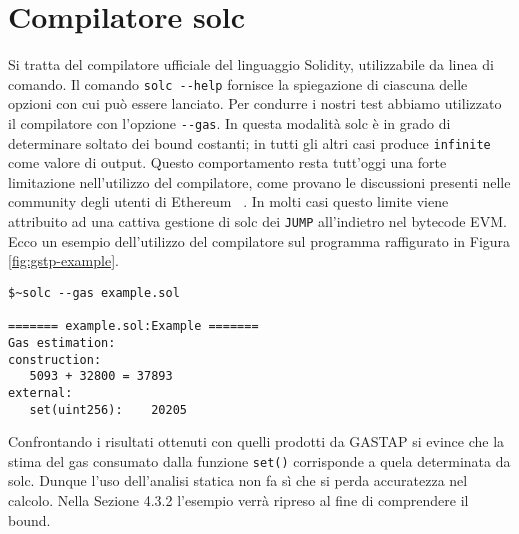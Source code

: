     
\section{Compilatore solc}

Si tratta del compilatore ufficiale del linguaggio Solidity, utilizzabile da linea di comando. Il comando \verb|solc --help| fornisce la spiegazione di ciascuna delle opzioni con cui può essere lanciato.\newline
\indent Per condurre i nostri test abbiamo utilizzato il compilatore con l'opzione \verb|--gas|. In questa modalità solc è in grado di determinare soltato dei bound costanti; in tutti gli altri casi produce \verb|infinite| come valore di output. Questo comportamento resta tutt'oggi una forte limitazione nell'utilizzo del compilatore, come provano le discussioni presenti nelle community degli utenti di Ethereum ~\cite{infinite-gas-github-issue, infinite-gas-stack-exchange, gas-costs-stack-exchange}. In molti casi questo limite viene attribuito ad una cattiva gestione di solc dei \texttt{JUMP} all'indietro nel bytecode EVM.\newline
\indent Ecco un esempio dell'utilizzo del compilatore sul programma raffigurato in Figura \ref{fig:gstp-example}.

\begin{center}
 \begin{minipage}{\linewidth}
\begin{lstlisting}
$~solc --gas example.sol 

======= example.sol:Example =======
Gas estimation:
construction:
   5093 + 32800 = 37893
external:
   set(uint256):	20205

\end{lstlisting}
\end{minipage}
\end{center}

Confrontando i risultati ottenuti con quelli prodotti da GASTAP si evince che la stima del gas consumato dalla funzione \verb|set()| corrisponde a quela determinata da solc. Dunque l'uso dell'analisi statica non fa sì che si perda accuratezza nel calcolo.\newline
\indent Nella Sezione 4.3.2 l'esempio verrà ripreso al fine di comprendere il bound.\newline
